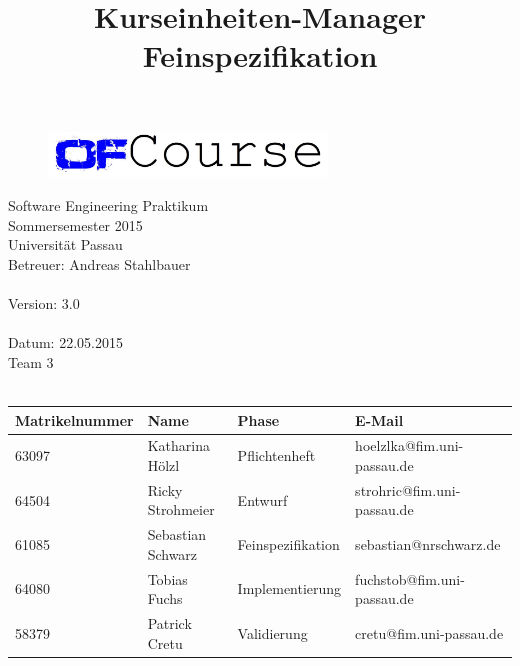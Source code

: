 \documentclass[a4paper, 12pt]{scrreprt}
\begin{document}
	\thispagestyle{plain}

\begin{titlepage}
    \begin{center}
        \begin{figure}[ht]
            \centering
            \includegraphics[width=0.66\textwidth, angle=0]{logo/name_blau_ofCourse.jpg}
        \end{figure}

    	\begin{title}
        	\title{\Huge{\textbf{Kurseinheiten-Manager \\ Feinspezifikation\\}}}

		\end{title}
		\hspace{3cm}

        	Software Engineering Praktikum \\
        	Sommersemester 2015\\
        	Universität Passau\\


        	Betreuer: Andreas Stahlbauer \\
        	\hspace{1,5cm}\\
        	Version: 3.0 \\
        	\hspace{1,5cm}\\
        	Datum: 22.05.2015\\[50pt]
        	Team 3 \\
    
		    \ \\
        
        \begin{tabular}{ | l | l | l | l |}
        	\hline
        	\textbf{Matrikelnummer} & \textbf{Name} & \textbf{Phase} & \textbf{E-Mail}  \\ \hline
        	63097 & Katharina Hölzl & Pflichtenheft & hoelzlka@fim.uni-passau.de \\ \hline
        	64504 & Ricky Strohmeier& Entwurf & strohric@fim.uni-passau.de  \\ \hline
        	61085 & Sebastian Schwarz & Feinspezifikation & sebastian@nrschwarz.de \\ \hline 
        	64080 & Tobias Fuchs & Implementierung  &  fuchstob@fim.uni-passau.de\\ \hline
        	58379 & Patrick Cretu  &  Validierung & cretu@fim.uni-passau.de \\ \hline
        \end{tabular}
        

\end{center}
\end{titlepage}
\end{document}
